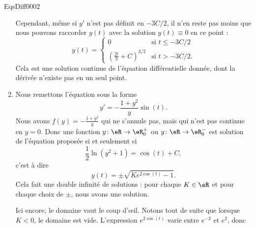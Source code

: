 \begin{corrige}{EqsDiff0002}
\begin{enumerate}
Cependant, même si $y'$ n'est pas définit en $-3C/2$, il n'en reste pas moins que nous pouvons raccorder $y(t)$ avec la solution $y(t)\equiv 0$ en ce point :
\begin{equation}
	y(t)=\begin{cases}
	0	&					\text{si $t\leq -3C/2$}\\
	\left( \frac{ 2t }{ 3 }+C \right)^{3/2}	&	\text{si $t>-3C/2$.}
\end{cases}
\end{equation}
Cela est une solution continue de l'équation différentielle donnée, dont la dérivée n'existe pas en un seul point.

\item
Nous remettons l'équation sous la forme
\begin{equation}
	y'=-\frac{ 1+y^2 }{ y }\sin(t).
\end{equation}
Nous avons $f(y)=-\frac{ 1+y^2 }{ y }$ qui ne s'annule pas, mais qui n'est pas continue en $y=0$. Donc une fonction $y\colon \eR\to \eR^+_0$ ou $y\colon \eR\to \eR^-_0$ est solution de l'équation proposée si et seulement si
\begin{equation}
	\frac{ 1 }{2}\ln(y^2+1)=\cos(t)+C,
\end{equation}
c'est à dire
\begin{equation}		\label{EqSolGeneRacExpCis}
	y(t)=\pm\sqrt{K e^{2\cos(t)}-1}.
\end{equation}
Cela fait une double infinité de solutions : pour chaque $K\in\eR$ et pour chaque choix de $\pm$, nous avons une solution.

Ici encore, le domaine vaut le coup d'œil. Notons tout de suite que lorsque $K<0$, le domaine est vide. L'expression $ e^{2\cos(t)}$ varie entre $e^{-2}$ et $e^2$, donc
\begin{enumerate}


\end{enumerate}
\end{enumerate}
\end{corrige}
